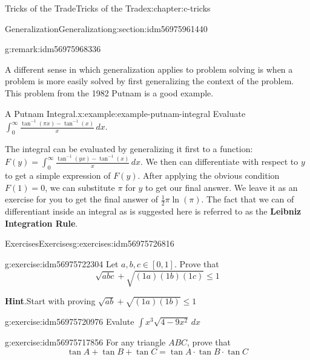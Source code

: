 \documentclass[twoside,10pt,]{book}
\newcommand{\blocktitlefont}{\relax}
\newcommand{\terminology}[1]{\textbf{#1}}
\numberwithin{equation}{section}
\begin{document}
\begin{chapterptx}{Tricks of the Trade}{}{Tricks of the Trade}{}{}{x:chapter:c-tricks}
\begin{sectionptx}{Generalization}{}{Generalization}{}{}{g:section:idm56975961440}
\begin{remark}{}{g:remark:idm56975968336}
\end{remark}
A different sense in which generalization applies to problem solving is when a problem is more easily solved by first generalizing the context of the problem.  This problem from the 1982 Putnam is a good example.%
\begin{example}{A Putnam Integral.}{x:example:example-putnam-integral}%
%
Evaluate \(\int_0^{\infty} \frac{\tan^{-1}(\pi  x)-\tan^{-1}(x)}{x} \, dx\).%
\par
The integral can be evaluated by generalizing it first to a function: \(F(y)=\int_0^{\infty} \frac{\tan ^{-1}(y x)-\tan ^{-1}(x)}{x} \, dx\). We then can differentiate with respect to \(y\) to get a simple expression of \(F(y)\).  After applying the obvious condition \(F(1)=0\), we can substitute \(\pi\) for \(y\) to get our final answer.  We leave it as an exercise for you to get the final answer of \(\frac{1}{2} \pi  \ln(\pi )\).   The fact that we can of differentiant inside an integral as is suggested here is referred to as the \terminology{Leibniz Integration Rule}.%
\end{example}
\end{sectionptx}
%
%
\typeout{************************************************}
\typeout{************************************************}
%
\begin{exercises-section}{Exercises}{}{Exercises}{}{}{g:exercises:idm56975726816}
\begin{divisionexercise}{1}{}{}{g:exercise:idm56975722304}%
Let \(a, b, c \in [0, 1]\). Prove that%
\begin{equation*}
\sqrt{a b c}+ \sqrt{(1a)(1b)(1c)} \leq 1
\end{equation*}
%
\par\smallskip%
\noindent\textbf{\blocktitlefont Hint}.\hypertarget{g:hint:idm56975720560}{}\quad{}Start with proving  \(\sqrt{a b}+ \sqrt{(1a)(1b)} \leq 1\)%
\end{divisionexercise}%
\begin{divisionexercise}{2}{}{}{g:exercise:idm56975720976}%
Evalute \(\int x^3 \sqrt{4-9x^2} \, dx\)%
\end{divisionexercise}%
\begin{divisionexercise}{3}{}{}{g:exercise:idm56975717856}%
For any triangle \(ABC\), prove that%
\begin{equation*}
\tan{A}+\tan{B}+\tan{C} = \tan{A}\cdot \tan{B}\cdot \tan{C}
\end{equation*}
%
\end{divisionexercise}%

\end{exercises-section}
\end{chapterptx}
\end{document}
